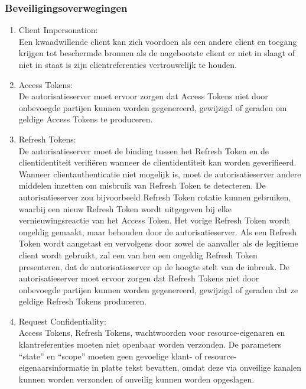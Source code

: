   \subsubsection{Beveiligingsoverwegingen}
  \label{subsubsec:beveiligingsoverwegingen}
  \begin{enumerate}[label=\textbf{-}]
      \item Client Impersonation: \\
      Een kwaadwillende client kan zich voordoen als een andere client en toegang krijgen tot beschermde bronnen als de nagebootste client er niet in slaagt of niet in staat is zijn clientreferenties vertrouwelijk te houden.
  
      \item Access Tokens: \\
      De autorisatieserver moet ervoor zorgen dat Access Tokens niet door onbevoegde partijen kunnen worden gegenereerd, gewijzigd of geraden om geldige Access Tokens te produceren.
  
      \item Refresh Tokens: \\
      De autorisatieserver moet de binding tussen het Refresh Token en de clientidentiteit verifiëren wanneer de clientidentiteit kan worden geverifieerd. Wanneer clientauthenticatie niet mogelijk is, moet de autorisatieserver andere middelen inzetten om misbruik van Refresh Token te detecteren. De autorisatieserver zou bijvoorbeeld Refresh Token rotatie kunnen gebruiken, waarbij een nieuw Refresh Token wordt uitgegeven bij elke vernieuwingsreactie van het Access Token. Het vorige Refresh Token wordt ongeldig gemaakt, maar behouden door de autorisatieserver. Als een Refresh Token wordt aangetast en vervolgens door zowel de aanvaller als de legitieme client wordt gebruikt, zal een van hen een ongeldig Refresh Token presenteren, dat de autorisatieserver op de hoogte stelt van de inbreuk. De autorisatieserver moet ervoor zorgen dat Refresh Tokens niet door onbevoegde partijen kunnen worden gegenereerd, gewijzigd of geraden dat ze geldige Refresh Tokens produceren.
  
      \item Request Confidentiality: \\
      Access Tokens, Refresh Tokens, wachtwoorden voor resource-eigenaren en klantreferenties moeten niet openbaar worden verzonden. De parameters ``state'' en ``scope'' moeten geen gevoelige klant- of resource-eigenaarsinformatie in platte tekst bevatten, omdat deze via onveilige kanalen kunnen worden verzonden of onveilig kunnen worden opgeslagen.
  \end{enumerate}


